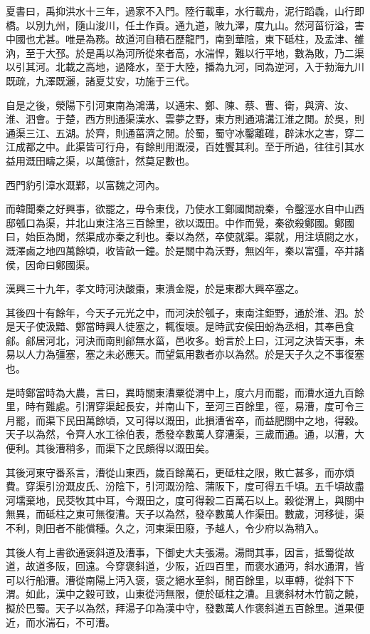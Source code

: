 夏書曰，禹抑洪水十三年，過家不入門。陸行載車，水行載舟，泥行蹈毳，山行即橋。以別九州，隨山浚川，任土作貢。通九道，陂九澤，度九山。然河菑衍溢，害中國也尤甚。唯是為務。故道河自積石歷龍門，南到華陰，東下砥柱，及孟津、雒汭，至于大邳。於是禹以為河所從來者高，水湍悍，難以行平地，數為敗，乃二渠以引其河。北載之高地，過降水，至于大陸，播為九河，同為逆河，入于勃海九川既疏，九澤既灑，諸夏艾安，功施于三代。

自是之後，滎陽下引河東南為鴻溝，以通宋、鄭、陳、蔡、曹、衛，與濟、汝、淮、泗會。于楚，西方則通渠漢水、雲夢之野，東方則通鴻溝江淮之閒。於吳，則通渠三江、五湖。於齊，則通菑濟之閒。於蜀，蜀守冰鑿離碓，辟沫水之害，穿二江成都之中。此渠皆可行舟，有餘則用溉浸，百姓饗其利。至于所過，往往引其水益用溉田疇之渠，以萬億計，然莫足數也。

西門豹引漳水溉鄴，以富魏之河內。

而韓聞秦之好興事，欲罷之，毋令東伐，乃使水工鄭國閒說秦，令鑿涇水自中山西邸瓠口為渠，并北山東注洛三百餘里，欲以溉田。中作而覺，秦欲殺鄭國。鄭國曰，始臣為閒，然渠成亦秦之利也。秦以為然，卒使就渠。渠就，用注填閼之水，溉澤鹵之地四萬餘頃，收皆畝一鐘。於是關中為沃野，無凶年，秦以富彊，卒并諸侯，因命曰鄭國渠。

漢興三十九年，孝文時河決酸棗，東潰金隄，於是東郡大興卒塞之。

其後四十有餘年，今天子元光之中，而河決於瓠子，東南注鉅野，通於淮、泗。於是天子使汲黯、鄭當時興人徒塞之，輒復壞。是時武安侯田蚡為丞相，其奉邑食鄃。鄃居河北，河決而南則鄃無水菑，邑收多。蚡言於上曰，江河之決皆天事，未易以人力為彊塞，塞之未必應天。而望氣用數者亦以為然。於是天子久之不事復塞也。

是時鄭當時為大農，言曰，異時關東漕粟從渭中上，度六月而罷，而漕水道九百餘里，時有難處。引渭穿渠起長安，并南山下，至河三百餘里，徑，易漕，度可令三月罷，而渠下民田萬餘頃，又可得以溉田，此損漕省卒，而益肥關中之地，得穀。天子以為然，令齊人水工徐伯表，悉發卒數萬人穿漕渠，三歲而通。通，以漕，大便利。其後漕稍多，而渠下之民頗得以溉田矣。

其後河東守番系言，漕從山東西，歲百餘萬石，更砥柱之限，敗亡甚多，而亦煩費。穿渠引汾溉皮氏、汾陰下，引河溉汾陰、蒲阪下，度可得五千頃。五千頃故盡河壖棄地，民茭牧其中耳，今溉田之，度可得穀二百萬石以上。穀從渭上，與關中無異，而砥柱之東可無復漕。天子以為然，發卒數萬人作渠田。數歲，河移徙，渠不利，則田者不能償種。久之，河東渠田廢，予越人，令少府以為稍入。

其後人有上書欲通褒斜道及漕事，下御史大夫張湯。湯問其事，因言，抵蜀從故道，故道多阪，回遠。今穿褒斜道，少阪，近四百里，而褒水通沔，斜水通渭，皆可以行船漕。漕從南陽上沔入褒，褒之絕水至斜，閒百餘里，以車轉，從斜下下渭。如此，漢中之穀可致，山東從沔無限，便於砥柱之漕。且褒斜材木竹箭之饒，擬於巴蜀。天子以為然，拜湯子卬為漢中守，發數萬人作褒斜道五百餘里。道果便近，而水湍石，不可漕。

